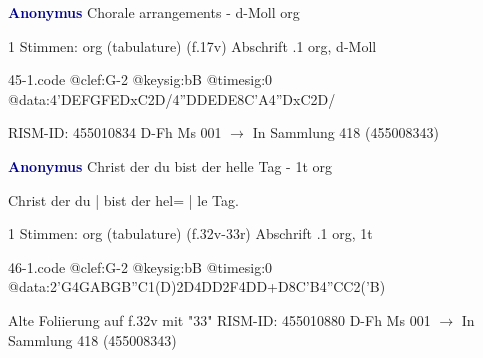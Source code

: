 \documentclass[twocolumn]{book}
\begin{document}
\newline \par \vspace{7pt} \textcolor{darkblue}{\textbf{Anonymus  }}
\newline Chorale arrangements - d-Moll
\newline org
\newline \begin{itshape}\end{itshape} 
\newline \textcolor{darkblue}{}  1 Stimmen: org (tabulature)  (f.17v)
\newline Abschrift
.1  org, d-Moll  
\begin{filecontents*}{45-1.code}
@clef:G-2
@keysig:bB
@timesig:0
@data:4'DEFGFEDxC2D/4''DDEDE{8C'A}4''DxC2D/
\end{filecontents*}
\newline
%
\newline RISM-ID: 455010834
\newline D-Fh  Ms 001
\newline $\rightarrow$ In Sammlung 418 (455008343)
      
\newline \par \vspace{7pt} \textcolor{darkblue}{\textbf{Anonymus  }}
\newline Christ der du bist der helle Tag - 1t
\newline org
\newline \begin{itshape}[f.32v, at left:] Christ der du | bist der hel= | le Tag.\end{itshape} 
\newline \textcolor{darkblue}{}  1 Stimmen: org (tabulature)  (f.32v-33r)
\newline Abschrift
.1  org, 1t  
\begin{filecontents*}{46-1.code}
@clef:G-2
@keysig:bB
@timesig:0
@data:2'G4GABGB''C1(D)2D4DD2F4DD+D{8C'B}4''CC2('B)
\end{filecontents*}
\newline
%
\newline Alte Foliierung auf f.32v mit "33"
\newline RISM-ID: 455010880
\newline D-Fh  Ms 001
\newline $\rightarrow$ In Sammlung 418 (455008343)
      
\end{document}
